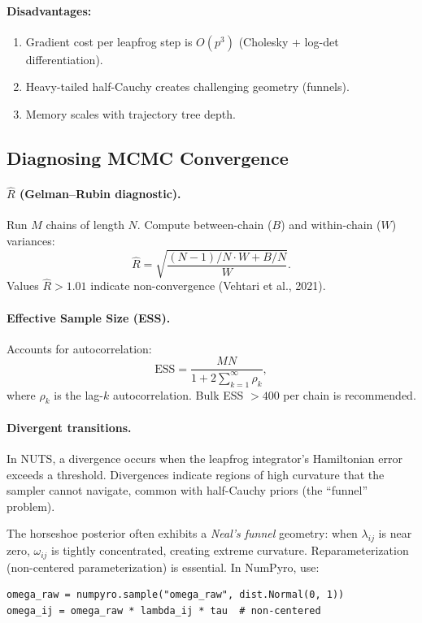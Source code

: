 \documentclass[11pt,a4paper]{article}
\begin{document}
\paragraph{Disadvantages:}
\begin{enumerate}[nosep]
  \item Gradient cost per leapfrog step is $O(p^3)$ (Cholesky + log-det differentiation).
  \item Heavy-tailed half-Cauchy creates challenging geometry (funnels).
  \item Memory scales with trajectory tree depth.
\end{enumerate}

\subsection{Diagnosing MCMC Convergence}

\paragraph{$\hat{R}$ (Gelman--Rubin diagnostic).} Run $M$ chains of length $N$. Compute between-chain ($B$) and within-chain ($W$) variances:
\begin{equation}
  \hat{R} = \sqrt{\frac{(N-1)/N \cdot W + B/N}{W}}.
\end{equation}
Values $\hat{R} > 1.01$ indicate non-convergence (Vehtari et al., 2021).

\paragraph{Effective Sample Size (ESS).} Accounts for autocorrelation:
\begin{equation}
  \text{ESS} = \frac{MN}{1 + 2\sum_{k=1}^{\infty}\rho_k},
\end{equation}
where $\rho_k$ is the lag-$k$ autocorrelation. Bulk ESS $> 400$ per chain is recommended.

\paragraph{Divergent transitions.} In NUTS, a divergence occurs when the leapfrog integrator's Hamiltonian error exceeds a threshold. Divergences indicate regions of high curvature that the sampler cannot navigate, common with half-Cauchy priors (the ``funnel'' problem).

\begin{warning}
The horseshoe posterior often exhibits a \emph{Neal's funnel} geometry: when $\lambda_{ij}$ is near zero, $\omega_{ij}$ is tightly concentrated, creating extreme curvature. Reparameterization (non-centered parameterization) is essential. In NumPyro, use:
\begin{lstlisting}
omega_raw = numpyro.sample("omega_raw", dist.Normal(0, 1))
omega_ij = omega_raw * lambda_ij * tau  # non-centered
\end{lstlisting}
\end{warning}
\end{document}
